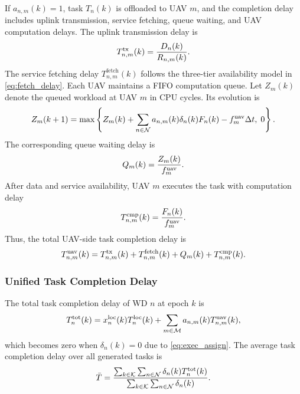 \documentclass[journal]{IEEEtran}
\begin{document}
If $a_{n,m}(k)=1$, task $T_n(k)$ is offloaded to UAV $m$, and the completion delay includes uplink transmission, service fetching, queue waiting, and UAV computation delays. The uplink transmission delay is
\begin{equation}
\small
    T_{n,m}^{\mathrm{tx}}(k)=\frac{D_n(k)}{R_{n,m}(k)}.
    \label{eq:tx_delay}
\end{equation}
The service fetching delay $T_{n,m}^{\mathrm{fetch}}(k)$ follows the three-tier availability model in \eqref{eq:fetch_delay}. Each UAV maintains a FIFO computation queue. Let $Z_m(k)$ denote the queued workload at UAV $m$ in CPU cycles. Its evolution is
\begin{equation}
\small
Z_m(k+1)=
\max\left\{
Z_m(k)+\sum_{n\in\mathcal{N}}a_{n,m}(k)\delta_n(k)F_n(k)
-f_m^{\mathrm{uav}}\Delta t,\;0
\right\}.
\label{eq:queue_update}
\end{equation}
The corresponding queue waiting delay is
\begin{equation}
\small
Q_m(k)=\frac{Z_m(k)}{f_m^{\mathrm{uav}}}.
\label{eq:queue_delay}
\end{equation}
After data and service availability, UAV $m$ executes the task with computation delay
\begin{equation}
\small
    T_{n,m}^{\mathrm{cmp}}(k)=\frac{F_n(k)}{f_m^{\mathrm{uav}}}.
    \label{eq:uav_cmp_delay}
\end{equation}
Thus, the total UAV-side task completion delay is
\begin{equation}
\small
    T_{n,m}^{\mathrm{uav}}(k)
    = T_{n,m}^{\mathrm{tx}}(k)
    + T_{n,m}^{\mathrm{fetch}}(k)
    + Q_m(k)
    + T_{n,m}^{\mathrm{cmp}}(k).
    \label{eq:total_uav_delay}
\end{equation}

\subsubsection{Unified Task Completion Delay}

The total task completion delay of WD $n$ at epoch $k$ is
\begin{equation}
\small
    T_n^{\mathrm{tot}}(k)
    = x_n^{\mathrm{loc}}(k)T_n^{\mathrm{loc}}(k)
    + \sum_{m\in\mathcal{M}} a_{n,m}(k)T_{n,m}^{\mathrm{uav}}(k),
    \label{eq:total_delay}
\end{equation}
which becomes zero when $\delta_n(k)=0$ due to \eqref{eq:exec_assign}. The average task completion delay over all generated tasks is
\begin{equation}
\small
    \bar{T}=
    \frac{\sum_{k\in\mathcal{K}}\sum_{n\in\mathcal{N}}
    \delta_n(k)T_n^{\mathrm{tot}}(k)}
    {\sum_{k\in\mathcal{K}}\sum_{n\in\mathcal{N}}\delta_n(k)}.
    \label{eq:avg_delay}
\end{equation}
\end{document}

